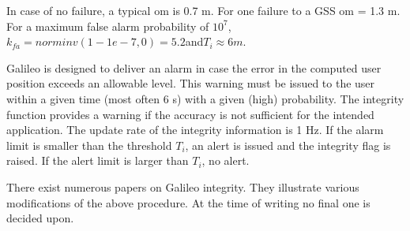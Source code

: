 		In case of no failure, a typical om is 0.7 m. For one failure to a GSS om = 1.3 m. For a maximum false alarm probability of $10^7$, $k_{fa}=norminv(1-1e-7,0)=5.2$and$T_i\approx6m$.
		
		Galileo is designed to deliver an alarm in case the error in the computed user position	exceeds an allowable level. This warning must be issued to the user within a given time (most often 6 s) with a given (high) probability. The integrity function provides a warning if the accuracy is not sufficient for the intended application. The update rate of the integrity information is 1 Hz. If the alarm limit is smaller than the threshold $T_i$, an alert is issued and the integrity flag is raised. If the alert limit is larger than $T_i$, no alert.
		
		There exist numerous papers on Galileo integrity. They illustrate various modifications of the above procedure. At the time of writing no final one is decided upon.
	
